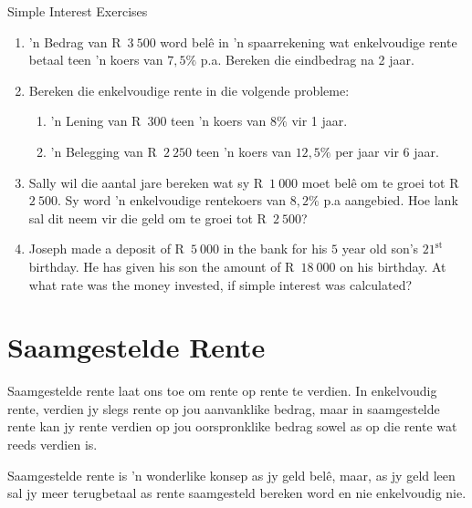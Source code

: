 \begin{exercises}{Simple Interest Exercises}
{
    \begin{enumerate}[label=\textbf{\arabic*}.]
	\item ’n Bedrag van R~$3~500$ word belê in ’n spaarrekening wat enkelvoudige rente betaal teen ’n koers van $7,5\%$ p.a. Bereken die eindbedrag na 2 jaar.

	\item Bereken die enkelvoudige rente in die volgende probleme:
	\begin{enumerate}
	    \item ’n Lening van R~$300$  teen ’n koers van $8\%$ vir 1 jaar.

	    \item ’n Belegging van R~$2~250$ teen ’n koers van $12,5\%$ per jaar vir 6 jaar.
	\end{enumerate}

	\item Sally wil die aantal jare bereken wat sy R~$1~000$ moet bel\^e om te groei tot R~$2~500$. Sy word 'n enkelvoudige rentekoers van $8,2\%$ p.a aangebied. Hoe lank sal dit neem vir die geld om te groei tot R~$2~500$?
	\item Joseph made a deposit of R~$5~000$ in the bank for his $5$ year old son's $21^{\mathrm{st}}$ birthday. He has given his son the amount of R~$18~000$ on his birthday. At what rate was the money invested, if simple interest was calculated?
    \end{enumerate}

}
\end{exercises}






\section{Saamgestelde Rente}

Saamgestelde rente laat ons toe om rente op rente te verdien. In enkelvoudig rente, verdien jy slegs rente op jou aanvanklike bedrag, maar in saamgestelde rente kan jy rente verdien op jou oorspronklike bedrag sowel as op die rente wat reeds verdien is.\par

Saamgestelde rente is 'n wonderlike konsep as jy geld bel\^e, maar, as jy geld leen sal jy meer terugbetaal as rente saamgesteld bereken word en nie enkelvoudig nie.



